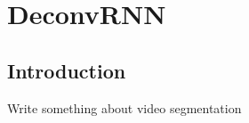 \chapter{DeconvRNN}

\section{Introduction}\label{sec:i}
Write something about video segmentation


